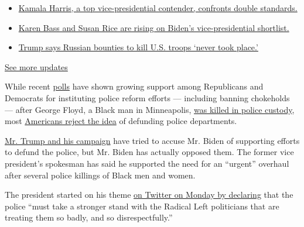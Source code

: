\begin{itemize}
\tightlist
\item
  \href{https://www.nytimes.com/2020/07/31/us/elections/biden-vs-trump.html?action=click\&pgtype=Article\&state=default\&region=MAIN_CONTENT_1\&context=storylines_live_updates\#link-29fdff45}{Kamala
  Harris, a top vice-presidential contender, confronts double
  standards.}
\item
  \href{https://www.nytimes.com/2020/07/31/us/elections/biden-vs-trump.html?action=click\&pgtype=Article\&state=default\&region=MAIN_CONTENT_1\&context=storylines_live_updates\#link-13ec3d9c}{Karen
  Bass and Susan Rice are rising on Biden's vice-presidential
  shortlist.}
\item
  \href{https://www.nytimes.com/2020/07/31/us/elections/biden-vs-trump.html?action=click\&pgtype=Article\&state=default\&region=MAIN_CONTENT_1\&context=storylines_live_updates\#link-49e9a016}{Trump
  says Russian bounties to kill U.S. troops `never took place.'}
\end{itemize}

\href{https://www.nytimes.com/2020/07/31/us/elections/biden-vs-trump.html?action=click\&pgtype=Article\&state=default\&region=MAIN_CONTENT_1\&context=storylines_live_updates}{See
more updates}

While recent
\href{https://www.reuters.com/article/us-minneapolis-police-poll-exclusive/exclusive-most-americans-including-republicans-support-sweeping-democratic-police-reform-proposals-reuters-ipsos-poll-idUSKBN23I380}{polls}
have shown growing support among Republicans and Democrats for
instituting police reform efforts --- including banning chokeholds ---
after George Floyd, a Black man in Minneapolis,
\href{https://www.nytimes.com/2020/05/31/us/george-floyd-investigation.html}{was
killed in police custody}, most
\href{https://fivethirtyeight.com/features/americans-like-the-ideas-behind-defunding-the-police-more-than-the-slogan-itself/}{Americans
reject the idea} of defunding police departments.

\href{https://apnews.com/afs:Content:9083703494}{Mr. Trump and his
campaign} have tried to accuse Mr. Biden of supporting efforts to defund
the police, but Mr. Biden has actually opposed them. The former vice
president's spokesman has said he supported the need for an ``urgent''
overhaul after several police killings of Black men and women.

The president started on his theme
\href{https://twitter.com/realDonaldTrump/status/1282647375257964544}{on
Twitter on Monday by declaring} that the police ``must take a stronger
stand with the Radical Left politicians that are treating them so badly,
and so disrespectfully.''

